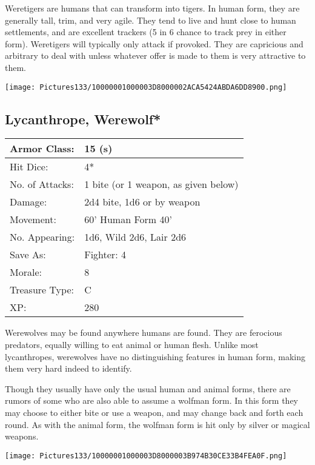 \documentclass[a4paper,twoside,openany,10pt]{book}
\begin{document}
\begin{multicols}{2}
Weretigers are humans that can transform into tigers. In human form, they are generally tall, trim, and very agile. They tend to live and hunt close to human settlements, and are excellent trackers (5 in 6 chance to track prey in either form). Weretigers will typically only attack if provoked. They are capricious and arbitrary to deal with unless whatever offer is made to them is very attractive to them.

\begin{center} \texttt{[image: Pictures133/10000001000003D8000002ACA5424ABDA6DD8900.png]} \end{center}


\subsection*{Lycanthrope, Werewolf*}\label{lycanthrope-werewolf}

\begin{tabularx}{0.50\textwidth}{@{}lX@{}}
Armor Class: & 15 (s) \\\hline
Hit Dice: & 4* \\\hline
No. of Attacks: & 1 bite (or 1 weapon, as given below) \\\hline
Damage: & 2d4 bite, 1d6 or by weapon \\\hline
Movement: & 60' Human Form 40' \\\hline
No. Appearing: & 1d6, Wild 2d6, Lair 2d6 \\\hline
Save As: & Fighter: 4 \\\hline
Morale: & 8 \\\hline
Treasure Type: & C \\\hline
XP: & 280 \\\hline
\end{tabularx}\medskip

Werewolves may be found anywhere humans are found. They are ferocious predators, equally willing to eat animal or human flesh. Unlike most lycanthropes, werewolves have no distinguishing features in human form, making them very hard indeed to identify.

Though they usually have only the usual human and animal forms, there are rumors of some who are also able to assume a wolfman form. In this form they may choose to either bite or use a weapon, and may change back and forth each round. As with the animal form, the wolfman form is hit only by silver or magical weapons.

\begin{center} \texttt{[image: Pictures133/10000001000003D8000003B974B30CE33B4FEA0F.png]} \end{center}



\end{multicols}
\end{document}
